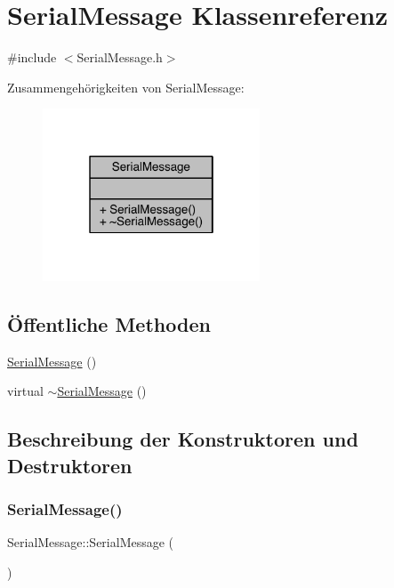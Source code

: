 \hypertarget{class_serial_message}{}\section{Serial\+Message Klassenreferenz}
\label{class_serial_message}


{\ttfamily \#include $<$Serial\+Message.\+h$>$}



Zusammengehörigkeiten von Serial\+Message\+:\nopagebreak
\begin{figure}[H]
\begin{center}
\leavevmode
\includegraphics[width=183pt]{class_serial_message__coll__graph}
\end{center}
\end{figure}
\subsection*{Öffentliche Methoden}
\begin{DoxyCompactItemize}
\item 
\hyperlink{class_serial_message_aef84d2a1b8928bf39c0f4e59bdf7e36f}{Serial\+Message} ()
\item 
virtual \hyperlink{class_serial_message_a9bcc2b473a850ca82bf139a9fee6debb}{$\sim$\+Serial\+Message} ()
\end{DoxyCompactItemize}


\subsection{Beschreibung der Konstruktoren und Destruktoren}
\hypertarget{class_serial_message_aef84d2a1b8928bf39c0f4e59bdf7e36f}{}\label{class_serial_message_aef84d2a1b8928bf39c0f4e59bdf7e36f} 
\subsubsection{\texorpdfstring{Serial\+Message()}{SerialMessage()}}
{\footnotesize\ttfamily Serial\+Message\+::\+Serial\+Message (\begin{DoxyParamCaption}{ }\end{DoxyParamCaption})}


